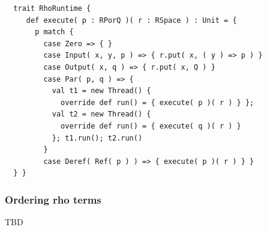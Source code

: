 \begin{lstlisting}
  trait RhoRuntime {
     def execute( p : RPorQ )( r : RSpace ) : Unit = {
       p match {
         case Zero => { }
         case Input( x, y, p ) => { r.put( x, ( y ) => p ) }
         case Output( x, q ) => { r.put( x, Q ) }
         case Par( p, q ) => {
           val t1 = new Thread() {
             override def run() = { execute( p )( r ) } };
           val t2 = new Thread() {
             override def run() = { execute( q )( r ) }
           }; t1.run(); t2.run()
         }
         case Deref( Ref( p ) ) => { execute( p )( r ) } }
  } }
\end{lstlisting}

\subsubsection{Ordering rho terms}

TBD
